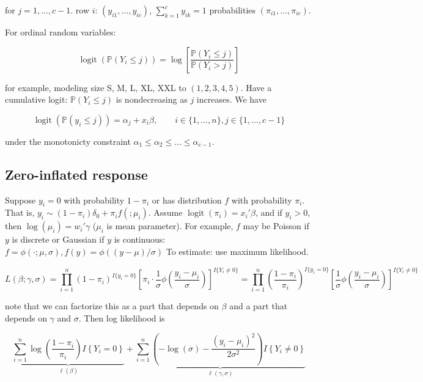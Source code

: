 for \(j = 1, \ldots, c -1\). row \(i\): \((y_{i1}, \ldots, y_{ic})\), \(\sum_{k=1}^c y_{ik} = 1\) probabilities \((\pi_{i1}, \ldots, \pi_{ic})\).

For ordinal random variables: 

\[
\operatorname{logit}( \mathbb{P}(Y_i \leq j) ) =  \log \left[  \frac{\mathbb{P}(Y_i \leq j)}{\mathbb{P}(Y_i > j)} \right]
\]

for example, modeling size S, M, L, XL, XXL to \((1, 2, 3, 4, 5)\). Have a cumulative logit: \(\mathbb{P}(Y_i \leq j)\) is nondecreasing as \(j\) increases. We have

\[
\operatorname{logit}(\mathbb{P}(y_i \leq j)) = \alpha_j + x_i \beta, \qquad i \in \{1, \ldots, n\}, j \in \{1, \ldots, c-1\}
\]

under the monotonicty constraint \(\alpha_1 \leq \alpha_2 \leq \ldots \leq \alpha_{c-1}\). 

\subsection{Zero-inflated response}

Suppose \(y_i = 0\) with probability \(1 - \pi_i\) or has distribution \(f\) with probability \(\pi_i\). That is, \(y_i \sim (1 - \pi_i) \delta_0 + \pi_i f( ;\mu_i)\). Assume \(\operatorname{logit}(\pi_i) = x_i' \beta\), and if \(y_i > 0\), then  \(\log(\mu_i) = w_i' \gamma\) (\(\mu_i\) is mean parameter). For example, \(f\) may be Poisson if \(y\) is discrete or Gaussian if \(y\) is continuous: \(f = \phi(\cdot; \mu, \sigma), f(y) = \phi((y-\mu)/\sigma)\) To estimate: use maximum likelihood.

\[
L(\beta; \gamma, \sigma) = \prod_{i=1}^n (1 - \pi_i)^{I\{y_i = 0\}} \left[ \pi_i \cdot \frac{1}{\sigma} \phi \left(  \frac{y_i - \mu_i}{\sigma} \right) \right]^{I\{Y_i \neq 0\}} 
=  \prod_{i=1}^n \left( \frac{1 - \pi_i}{\pi_i} \right)^{I\{y_i = 0\}} \left[  \frac{1}{\sigma} \phi \left(  \frac{y_i - \mu_i}{\sigma} \right) \right]^{I\{Y_i \neq 0\}} 
\]

note that we can factorize this as a part that depends on \(\beta\) and a part that depends on \(\gamma\) and \(\sigma\). Then log likelihood is 

\[
\underbrace{\sum_{i=1}^n \log \left( \frac{1 - \pi_i}{\pi_i} \right) I\left\{ Y_i = 0  \right\}}_{\ell(\beta)} + \underbrace{\sum_{i=1}^n  \left( - \log(\sigma) - \frac{(y_i - \mu_i)^2}{2 \sigma^2} \right) I\left\{ Y_i \neq 0  \right\}}_{\ell(\gamma, \sigma)}
\]

